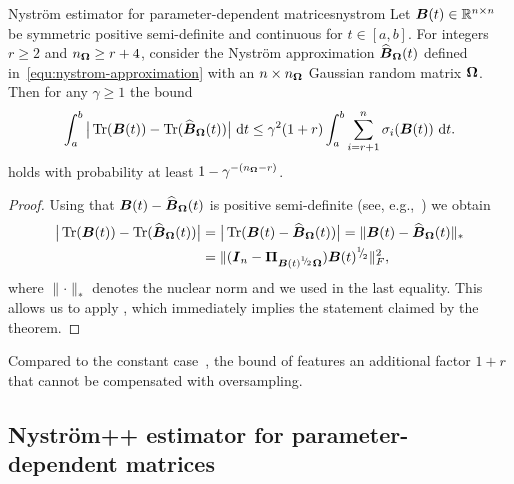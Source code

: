 \begin{theorem}{Nyström estimator for parameter-dependent matrices}{nystrom}
    Let $\boldsymbol{B}(t) \in \mathbb{R}^{n \times n}$ be symmetric positive semi-definite and continuous for $t \in [a, b]$. For integers $r \geq 2$ and $n_{\boldsymbol{\Omega}} \geq r + 4$, consider the Nystr\"om approximation $\widehat{\boldsymbol{B}}_{\boldsymbol{\Omega}}(t)$ defined in~\eqref{equ:nystrom-approximation} with an $n\times n_{\boldsymbol{\Omega}}$ Gaussian random matrix $\boldsymbol{\Omega}$. Then for any $\gamma \geq 1$ the bound 
    \[
        \int_{a}^{b} \big| \operatorname{Tr}(\boldsymbol{B}(t)) - \operatorname{Tr}(\widehat{\boldsymbol{B}}_{\boldsymbol{\Omega}}(t)) \big| ~\mathrm{d}t
        \leq \gamma^2 (1 + r) \int_{a}^{b} \sum_{i = r+1}^{n} \sigma_i(\boldsymbol{B}(t)) ~\mathrm{d}t.
    \]
    holds with probability at least $1 - \gamma^{-(n_{\boldsymbol{\Omega}} - r)}$.
\end{theorem}
\begin{proof}
Using that $\boldsymbol{B}(t) - \widehat{\boldsymbol{B}}_{\boldsymbol{\Omega}}(t)$ is positive semi-definite (see, e.g.,~\cite[Lemma 2.1]{frangella-2023-randomized-nystrom}) we obtain
    \begin{align*}
        \big| \operatorname{Tr}(\boldsymbol{B}(t)) - \operatorname{Tr}(\widehat{\boldsymbol{B}}_{\boldsymbol{\Omega}}(t)) \big|
        & = \big| \operatorname{Tr}(\boldsymbol{B}(t) - \widehat{\boldsymbol{B}}_{\boldsymbol{\Omega}}(t)) \big|
        = \lVert \boldsymbol{B}(t) - \widehat{\boldsymbol{B}}_{\boldsymbol{\Omega}}(t) \rVert _{\ast} \\
        & = \lVert (\boldsymbol{I}_n - \boldsymbol{\Pi}_{\boldsymbol{B}(t)^{{}^{1}{\mskip -5mu/\mskip -3mu}_{2}} \boldsymbol{\Omega}}) \boldsymbol{B}(t)^{{}^{1}{\mskip -5mu/\mskip -3mu}_{2}} \rVert _F^2,
    \end{align*}
    where $\lVert \cdot \rVert _{\ast}$ denotes the nuclear norm and we used \cite[Theorem 1]{gittens-2011-spectral-norm} in the last equality. This allows us to apply \cite[Theorem 5]{kressner-2024-randomized-lowrank}, which immediately implies the statement claimed by the theorem.
\end{proof}

Compared to the constant case~\cite[Theorem 8.1]{tropp-2023-randomized-algorithms}, the bound of  features an additional factor $1+r$ that cannot be compensated with oversampling.

\subsection{Nyström++ estimator for parameter-dependent matrices}
\label{subsec:nystrom-pp}


